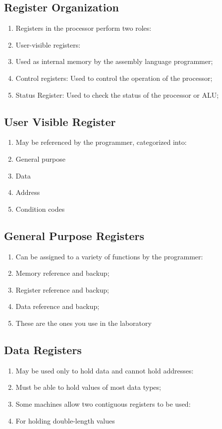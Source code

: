 \documentclass[11pt]{article}
\begin{document}
\subsection{Register Organization}

\begin{enumerate}
	\item Registers in the processor perform two roles:
	\item User-visible registers:
	\item Used as internal memory by the assembly language programmer;
	\item Control registers: Used to control the operation of the processor;
	\item Status Register: Used to check the status of the processor or ALU;
\end{enumerate}

\subsection{User Visible Register}
\begin{enumerate}
	\item May be referenced by the programmer, categorized into:
	\item General purpose
	\item Data
	\item Address
	\item Condition codes
\end{enumerate}

\subsection{General Purpose Registers}
\begin{enumerate}
	\item Can be assigned to a variety of functions by the programmer:
	\item Memory reference and backup;
	\item Register reference and backup;
	\item Data reference and backup;
	\item These are the ones you use in the laboratory

\end{enumerate}


\subsection{Data Registers}
\begin{enumerate}
	\item May be used only to hold data and cannot hold addresses:
	\item Must be able to hold values of most data types;
	\item Some machines allow two contiguous registers to be used:
	\item For holding double-length values

\end{enumerate}
\end{document}
